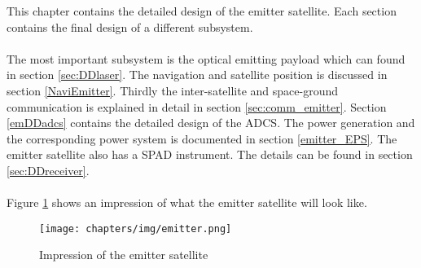 This chapter contains the detailed design of the emitter satellite. Each section contains the final design of a different subsystem. 
\\\\
The most important subsystem is the optical emitting payload which can found in section \ref{sec:DDlaser}. The navigation and satellite position is discussed in section \ref{NaviEmitter}. Thirdly the inter-satellite and space-ground communication is explained in detail in section \ref{sec:comm_emitter}. Section \ref{emDDadcs} contains the detailed design of the \ac{ADCS}. The power generation and the corresponding power system is documented in section \ref{emitter_EPS}. The emitter satellite also has a \ac{SPAD} instrument. The details can be found in section \ref{sec:DDreceiver}.
\\\\
Figure \ref{fig:emitterSat} shows an impression of what the emitter satellite will look like.

\begin{figure}
\texttt{[image: chapters/img/emitter.png]}
\caption{Impression of the emitter satellite}
\label{fig:emitterSat}
\end{figure}